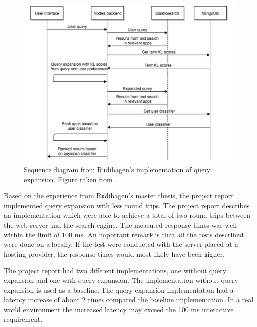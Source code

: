 \begin{figure}[h!]
  \centering \includegraphics[width=1\linewidth]{img/sequence-diagram-rudihagen.png}
  \caption{Sequence diagram from Rudihagen's implementation of query expansion. Figure taken from \cite{master-thesis}.}
  \label{fig:sequence-diagram-rudihagen}
\end{figure}

Based on the experience from Rudihagen's master thesis,
the project report \cite{project-report} implemented query expansion with less round trips.
The project report describes an implementation which were able to achieve a total of two round trips between the web server and the search engine.
The measured response times was well within the limit of 100 ms.
An important remark is that all the tests described were done on a locally.
If the test were conducted with the server placed at a hosting provider,
the response times would most likely have been higher.

The project report had two different implementations, one without query expansion and one with query expansion.
The implementation without query expansion is used as a baseline.
The query expansion implementation had a latency increase of about 2 times compared the baseline implementation.
In a real world environment the increased latency may exceed the 100 ms interactive requirement.
